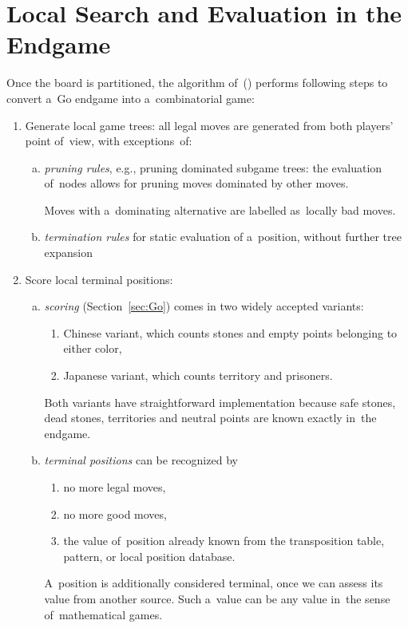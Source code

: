 \section{Local Search and Evaluation in the Endgame}
Once the board is partitioned, the algorithm of~(\cite{Muller1995computer}) performs following steps to convert a~Go endgame into a~combinatorial game:
\begin{enumerate}
  \item Generate local game trees:
    all legal moves are generated from both players' point of~view, with exceptions~of:
    \begin{enumerate}[(a)]
      \item \emph{pruning rules}\footnotemark{}, e.g., pruning dominated subgame trees:
        the evaluation of~nodes allows for pruning moves dominated by other moves.

        Moves with a~dominating alternative are labelled as~locally bad moves.

      \item \emph{termination rules}\footnotemark{} for static evaluation of a~position, without further tree expansion%
    \end{enumerate}

  \item Score local terminal positions:
    \begin{enumerate}[(a)]
      \item \emph{scoring} (Section~\ref{sec:Go}) comes in two widely accepted variants:
        \begin{enumerate}[$\diamondsuit$]
          \item Chinese variant, which counts stones and empty points belonging to either color,
          \item Japanese variant, which counts territory and prisoners.
        \end{enumerate}
        Both variants have straightforward implementation because safe stones, dead stones, territories and neutral points are known exactly in~the endgame.

      \item \emph{terminal positions} can be recognized by
        \begin{enumerate}[$\diamondsuit$]
          \item no more legal moves,
          \item no more good moves,
          \item the value of~position already known from the transposition table, pattern, or local position database.
        \end{enumerate}
        A~position is additionally considered terminal, once we can assess its value from another source.
        Such a~value can be any value in~the sense of~mathematical games.
    \end{enumerate}


\end{enumerate}
